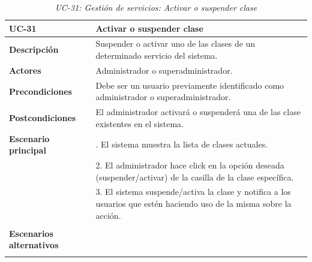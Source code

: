 \begin{table}
  \begin{center}
    \begin{tabularx}{16.4cm}{|l|X|}
      \hline
      \textbf{UC-31} & \textbf{Activar o suspender clase}\\
      \hline
      \textbf{Descripción} & Suspender o activar uno de las clases de un determinado servicio del sistema.\\
      \hline
      \textbf{Actores} & Administrador o superadministrador.\\
      \hline
      \textbf{Precondiciones} & Debe ser un usuario previamente identificado como administrador o superadministrador.\\
      \hline
      \textbf{Postcondiciones} & El administrador activará o suspenderá una de las clase existentes en el sistema.\\
      \hline
      \textbf{Escenario principal} & \smallskip 1. El sistema muestra la lista de clases actuales.\\
      & 2. El administrador hace click en la opción deseada (suspender/activar) de la casilla de la clase específica.\\
      & 3. El sistema suspende/activa la clase y notifica a los usuarios que estén haciendo uso de la misma sobre la acción.\\
      & \\
      \hline
      \textbf{Escenarios alternativos} & \smallskip \\
      & \\
      \hline
    \end{tabularx}
    \caption{\textit{UC-31: Gestión de servicios: Activar o suspender clase}}
    \label{tab:CU-activar-suspender-clase}
  \end{center}
\end{table}


